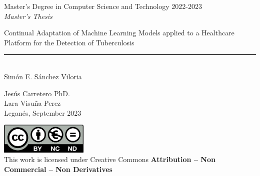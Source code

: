 \documentclass[../main.tex]{subfiles}
\begin{document}
\begin{titlepage}
	\begin{sffamily}
	\color{azulUC3M}
	\begin{center}
		\begin{figure}[H] %
		\end{figure}
		\vspace{2.5cm}
		\begin{Large}
			Master's Degree in Computer Science and Technology
			2022-2023\\
			\vspace{2cm}		
			\textsl{Master's Thesis}
			\bigskip 
			
			{\Huge 
				Continual Adaptation of Machine Learning Models
				applied to a Healthcare Platform
				for the Detection of Tuberculosis
			}\\ %
		\end{Large}
		 	\vspace*{0.5cm}
	 		\rule{10.5cm}{0.1mm}\\
			\vspace*{0.9cm}
			{\LARGE Simón E. Sánchez Viloria }\\ 
			\vspace*{1cm}
		\begin{Large}
			Jesús Carretero PhD.\\ Lara Visuña Perez \\
			Leganés, September 2023\\ %
		\end{Large}
	\end{center}
	\vfill
	\color{black}
	\includegraphics[width=4.2cm]{figures/creativecommons.png}\\  %
	This work is licensed under Creative Commons \textbf{Attribution – Non Commercial – Non Derivatives}
	\end{sffamily}
\end{titlepage}
\end{document}
